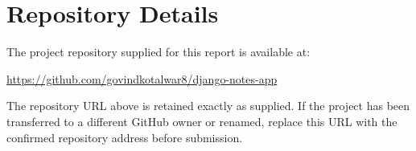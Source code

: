 \documentclass[12pt,a4paper,oneside]{report}
\begin{document}
\chapter{Repository Details}
The project repository supplied for this report is available at:

\url{https://github.com/govindkotalwar8/django-notes-app}

The repository URL above is retained exactly as supplied. If the project has been transferred to a different GitHub owner or renamed, replace this URL with the confirmed repository address before submission.
\end{document}
